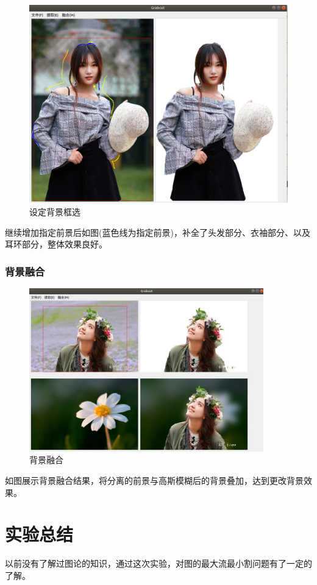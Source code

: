 \documentclass[12pt]{article}
\begin{document}
	\begin{figure}[H]
		\centering
		\includegraphics[width=5in]{./2_3.png}
		\centering
		\caption{设定背景框选}
	\end{figure}
	继续增加指定前景后如图(蓝色线为指定前景)，补全了头发部分、衣袖部分、以及耳环部分，整体效果良好。
	
	\subsubsection{背景融合}
	
	\begin{figure}[H]
		\centering
		\includegraphics[width=4in]{./3.png}
		\centering
		\caption{背景融合}
	\end{figure}
	如图展示背景融合结果，将分离的前景与高斯模糊后的背景叠加，达到更改背景效果。
	
	
	\section{实验总结}
	以前没有了解过图论的知识，通过这次实验，对图的最大流最小割问题有了一定的了解。
	
\end{document}
